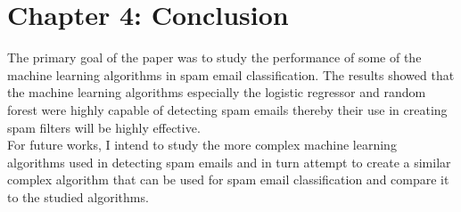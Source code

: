 \section{Chapter 4: Conclusion}
The primary goal of the paper was to study the performance of some of the machine learning algorithms in spam email classification. The results showed that the machine learning algorithms especially the logistic regressor and random forest were highly capable of detecting spam emails thereby their use in creating spam filters will be highly effective. \\
For future works, I intend to study the more complex machine learning algorithms used in detecting spam emails and in turn attempt to create a similar complex algorithm that can be used for spam email classification and compare it to the studied algorithms.